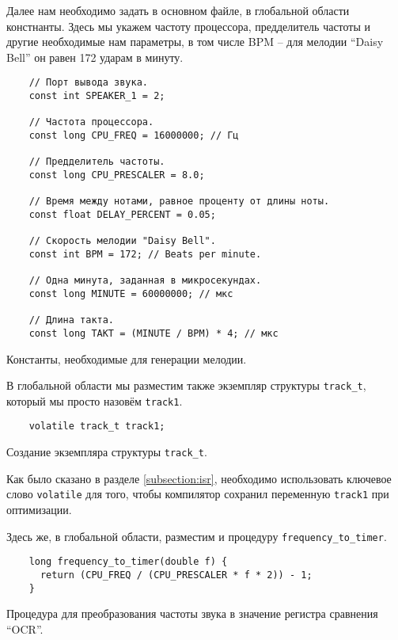 \documentclass[../sparc.tex]{subfiles}
\begin{document}
Далее нам необходимо задать в основном файле, в глобальной области констнанты.
Здесь мы укажем частоту процессора, предделитель частоты и другие необходимые
нам параметры, в том числе \gls{BPM} -- для мелодии ``Daisy Bell'' он равен 172
ударам в минуту.

\begin{listing}[H]
  \begin{verbatim}
    // Порт вывода звука.
    const int SPEAKER_1 = 2;

    // Частота процессора.
    const long CPU_FREQ = 16000000; // Гц

    // Предделитель частоты.
    const long CPU_PRESCALER = 8.0;

    // Время между нотами, равное проценту от длины ноты.
    const float DELAY_PERCENT = 0.05;

    // Скорость мелодии "Daisy Bell".
    const int BPM = 172; // Beats per minute.

    // Одна минута, заданная в микросекундах.
    const long MINUTE = 60000000; // мкс

    // Длина такта.
    const long TAKT = (MINUTE / BPM) * 4; // мкс
  \end{verbatim}
  \caption{Константы, необходимые для генерации мелодии.}
  \label{listing:mcu-music-4}
\end{listing}

В глобальной области мы разместим также экземпляр структуры
\texttt{track_t}, который мы просто назовём \texttt{track1}.

\begin{listing}[H]
  \begin{verbatim}
    volatile track_t track1;
  \end{verbatim}
  \caption{Создание экземпляра структуры \texttt{track_t}.}
  \label{listing:mcu-music-5}
\end{listing}

Как было сказано в разделе \ref{subsection:isr}, необходимо использовать
ключевое слово \texttt{volatile} для того, чтобы компилятор сохранил
переменную \texttt{track1} при оптимизации.

Здесь же, в глобальной области, разместим и процедуру
\texttt{frequency_to_timer}.

\begin{listing}[H]
  \begin{verbatim}
    long frequency_to_timer(double f) {
      return (CPU_FREQ / (CPU_PRESCALER * f * 2)) - 1;
    }
  \end{verbatim}
  \caption{Процедура для преобразования частоты звука в значение регистра
    сравнения ``OCR''.}
  \label{listing:mcu-music-6}
\end{listing}
\end{document}
